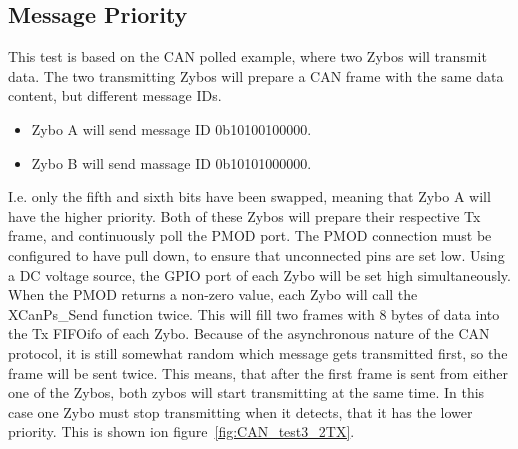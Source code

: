 \subsection{Message Priority}\label{sub:CAN_message priority}
This test is based on the CAN polled example, where two Zybos will transmit data.
The two transmitting Zybos will prepare a CAN frame with the same data content, but different message IDs.
\begin{itemize}
	\item Zybo A will send message ID 0b10100100000.
	\item Zybo B will send massage ID 0b10101000000.
\end{itemize}
I.e. only the fifth and sixth bits have been swapped, meaning that Zybo A will have the higher priority.
Both of these Zybos will prepare their respective Tx frame, and continuously poll the PMOD port.
The PMOD connection must be configured to have pull down, to ensure that unconnected pins are set low.
Using a DC voltage source, the GPIO port of each Zybo will be set high simultaneously.\\

When the PMOD returns a non-zero value, each Zybo will call the XCanPs\_Send function twice.
This will fill two frames with 8 bytes of data into the Tx FIFOifo of each Zybo. 
Because of the asynchronous nature of the CAN protocol, it is still somewhat random which message gets transmitted first, so the frame will be sent twice. 
This means, that after the first frame is sent from either one of the Zybos, both zybos will start transmitting at the same time. 
In this case one Zybo must stop transmitting when it detects, that it has the lower priority.
This is shown ion figure~\ref{fig:CAN_test3_2TX}.\\

